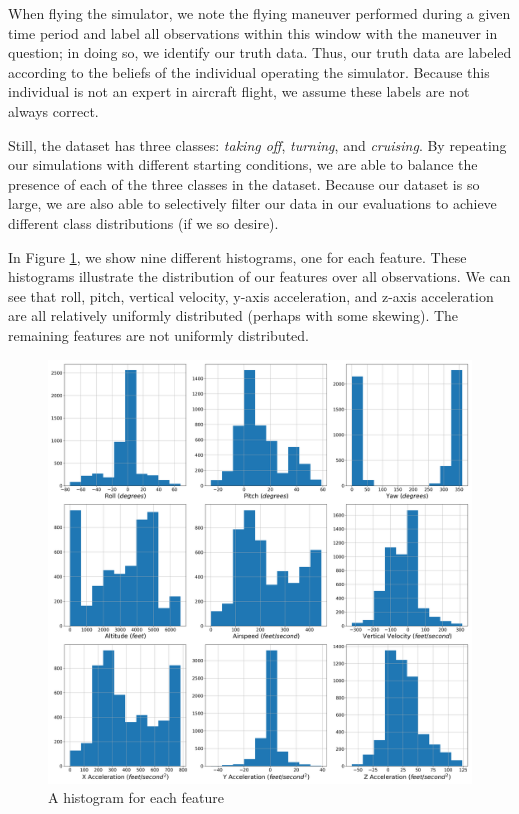 \documentclass[11pt]{article}
\begin{document}

When flying the simulator, we note the flying maneuver performed during a given time period and label all observations within this window with the maneuver in question; in doing so, we identify our truth data. Thus, our truth data are labeled according to the beliefs of the individual operating the simulator. Because this individual is not an expert in aircraft flight, we assume these labels are not always correct.


Still, the dataset has three classes: \textit{taking off}, \textit{turning}, and \textit{cruising}. By repeating our simulations with different starting conditions, we are able to balance the presence of each of the three classes in the dataset. Because our dataset is so large, we are also able to selectively filter our data in our evaluations to achieve different class distributions (if we so desire).


In Figure \ref{fig:hist}, we show nine different histograms, one for each feature. These histograms illustrate the distribution of our features over all observations. We can see that roll, pitch, vertical velocity, y-axis acceleration, and z-axis acceleration are all relatively uniformly distributed (perhaps with some skewing). The remaining features are not uniformly distributed.

\begin{figure}[ht]
    \centering
    \includegraphics[scale=0.25]{all-feature-histogram.png}
    \caption{A histogram for each feature}
    \label{fig:hist}
\end{figure}
\end{document}
